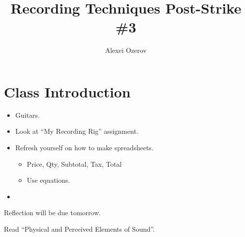 \documentclass{article}
\title{Recording Techniques Post-Strike \#3}
\author{Alexei Ozerov}
\date{}
\begin{document}
\maketitle

\section{Class Introduction}

\begin{itemize}
\item Guitars.
\item Look at ``My Recording Rig'' assignment.
\item Refresh yourself on how to make spreadsheets.
	\begin{itemize}
	\item Price, Qty, Subtotal, Tax, Total
	\item Use equations.
	\end{itemize}
\item 
\end{itemize}

\medskip

Reflection will be due tomorrow.

\medskip

Read ``Physical and Perceived Elements of Sound''.

\medskip
\end{document}
